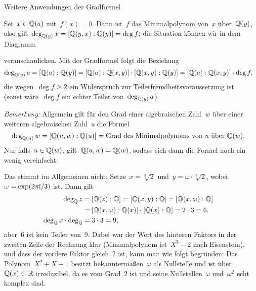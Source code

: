 \documentclass{algblatt}
\begin{document}
\begin{aufgabe}{Weitere Anwendungen der Gradformel}
\begin{loesungE}
\item Sei~$x \in \mathbb{Q}(a)$ mit~$f(x) = 0$. Dann ist~$f$ das Minimalpolynom
von~$x$ über~$\mathbb{Q}(y)$, also gilt~$\deg_{\mathbb{Q}(y)} x = [\mathbb{Q}(y,x):\mathbb{Q}(y)] =
\deg f$; die Situation können wir in dem Diagramm
\begin{center}\end{center}
veranschaulichen. Mit der Gradformel folgt die Beziehung
\[ \deg_{\mathbb{Q}(y)} a = [\mathbb{Q}(a):\mathbb{Q}(y)] = [\mathbb{Q}(a):\mathbb{Q}(x,y)] \cdot [\mathbb{Q}(x,y):\mathbb{Q}(y)] =
  [\mathbb{Q}(a):\mathbb{Q}(x,y)] \cdot \deg f, \]
die wegen~$\deg f \geq 2$ ein Widerspruch zur Teilerfremdheitsvoraussetzung
ist (sonst wäre~$\deg f$ ein echter Teiler von~$\deg_{\mathbb{Q}(y)} a$).

\emph{Bemerkung:} Allgemein gilt für den Grad einer algebraischen Zahl~$w$ über
einer weiteren algebraischen Zahl~$u$ die Formel
\[ \deg_{\mathbb{Q}(u)} w = [\mathbb{Q}(u,w):\mathbb{Q}(u)] = \text{Grad des Minimalpolynoms
von~$u$ über~$\mathbb{Q}(w)$}. \]
Nur falls~$u \in \mathbb{Q}(w)$, gilt~$\mathbb{Q}(u,w) = \mathbb{Q}(w)$, sodass sich dann die Formel
noch ein wenig vereinfacht.

\item Das stimmt im Allgemeinen nicht: Setze~$x = \sqrt[3]{2}$ und~$y = \omega
\cdot \sqrt[3]{2}$, wobei~$\omega = \exp(2\pi\mathrm{i}/3)$ ist. Dann gilt
\begin{align*}
  \deg_{\mathbb{Q}} z &= [\mathbb{Q}(z):\mathbb{Q}] = [\mathbb{Q}(x,y):\mathbb{Q}] = [\mathbb{Q}(x,\omega):\mathbb{Q}] \\
  &= [\mathbb{Q}(x,\omega):\mathbb{Q}(x)] \cdot [\mathbb{Q}(x):\mathbb{Q}] = 2 \cdot 3 = 6, \\
  \deg_{\mathbb{Q}} x \cdot \deg_{\mathbb{Q}} &= 3 \cdot 3 = 9,
\end{align*}
aber~$6$ ist kein Teiler von~$9$.
Dabei war der Wert des hinteren Faktors in der zweiten Zeile der Rechnung klar (Minimalpolynom ist~$X^3 - 2$ nach
Eisenstein), und dass der vordere Faktor gleich~$2$ ist, kann man wie folgt
begründen: Das Polynom~$X^2 + X + 1$ besitzt bekanntermaßen~$\omega$ als
Nullstelle und ist über~$\mathbb{Q}(x) \subset \mathbb{R}$ irreduzibel, da es vom Grad~$2$
ist und seine Nullstellen~$\omega$ und~$\omega^2$ echt komplex sind.


\end{loesungE}
\end{aufgabe}
\end{document}
